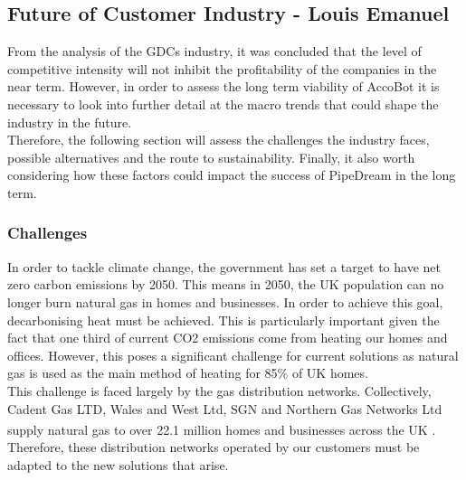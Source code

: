 \documentclass[11pt]{article}		%
\newcommand{\supercite}[1]{\textsuperscript{\cite{#1}}}		%
\newcommand{\sectref}[1]{\hyperref[#1]{Section \ref*{#1}}}     %
\begin{document}
                
        
        \subsection[Future of Customer Industry]{Future of Customer Industry - Louis Emanuel}
		
    		From the analysis of the GDCs industry, it was concluded that the level of competitive intensity will not inhibit the profitability of the companies in the near term. However, in order to assess the long term viability of AccoBot it is necessary to look into further detail at the macro trends that could shape the industry in the future.\\
    	    \hspace*{3ex}Therefore, the following section will assess the challenges the industry faces, possible alternatives and the route to sustainability. Finally, it also worth considering how these factors could impact the success of PipeDream in the long term. 
    	    
    	    \subsubsection[Challenges]{Challenges}
            In order to tackle climate change, the government has set a target to have net zero carbon emissions by 2050. This means in 2050, the UK population can no longer burn natural gas in homes and businesses. In order to achieve this goal, decarbonising heat must be achieved. This is particularly important given the fact that one third of current CO2 emissions come from heating our homes and offices. However, this poses a significant challenge for current solutions as natural gas is used as the main method of heating for 85\% of UK homes.\\
            \hspace*{3ex}This challenge is faced largely by the gas distribution networks. Collectively, Cadent Gas LTD, Wales and West Ltd, SGN and Northern Gas Networks Ltd supply natural gas to over 22.1 million homes and businesses across the UK \supercite{supplied}. Therefore, these distribution networks operated by our customers must be adapted to the new solutions that arise. 
    
\end{document}

